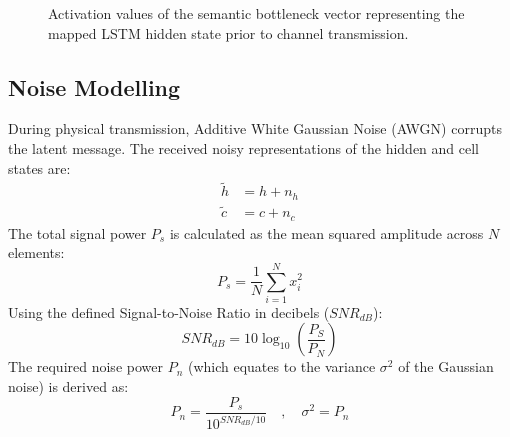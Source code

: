 \documentclass[12pt, a4paper, twocolumn]{article}
\begin{document}
\begin{figure}[htbp]
\centering
{}
\caption{Activation values of the semantic bottleneck vector representing the mapped LSTM hidden state prior to channel transmission.}
\label{fig:bottleneck_vector}
\end{figure}

\subsection{\textbf{Noise Modelling}}
During physical transmission, Additive White Gaussian Noise (AWGN) corrupts the latent message. The received noisy representations of the hidden and cell states are:
\begin{align}
    \tilde{h} &= h + n_h \\
    \tilde{c} &= c + n_c
\end{align}
The total signal power $P_s$ is calculated as the mean squared amplitude across $N$ elements:
\begin{equation}
    P_s = \frac{1}{N} \sum_{i=1}^N x_i^2
\end{equation}
Using the defined Signal-to-Noise Ratio in decibels ($SNR_{dB}$):
\begin{equation}
    SNR_{dB} = 10 \log_{10} \left( \frac{P_S}{P_N} \right)
\end{equation}
The required noise power $P_n$ (which equates to the variance $\sigma^2$ of the Gaussian noise) is derived as:
\begin{equation}
    P_n = \frac{P_s}{10^{SNR_{dB}/10}} \quad , \quad \sigma^2 = P_n
\end{equation}
\end{document}
